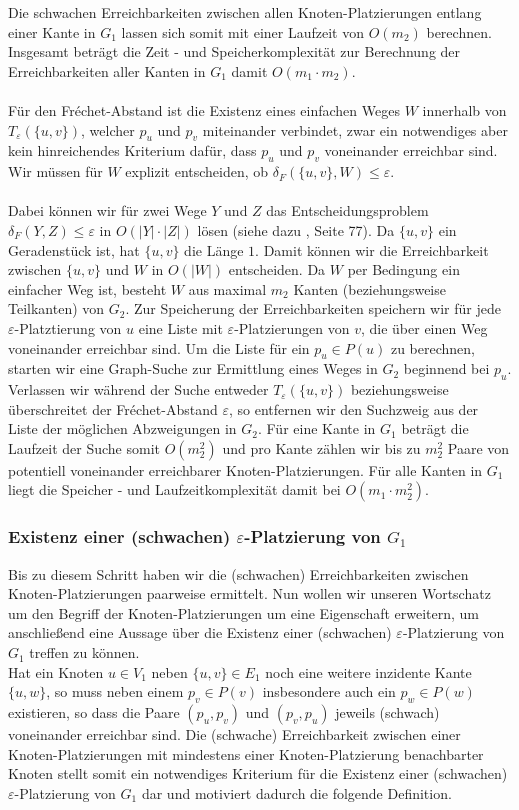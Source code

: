 \documentclass[a4paper, 12pt, twoside]{article}
\theoremstyle{Format1} %
\begin{document}
Die schwachen Erreichbarkeiten zwischen allen Knoten-Platzierungen entlang einer Kante in $G_1$ lassen sich somit mit einer Laufzeit von $O(m_2)$ berechnen.
Insgesamt beträgt die Zeit - und Speicherkomplexität zur Berechnung der Erreichbarkeiten aller Kanten in $G_1$ damit $O(m_1 \cdot m_2)$.
\\
\\
Für den Fréchet-Abstand ist die Existenz eines einfachen Weges $W$ innerhalb von $T_{\varepsilon}(\{u,v\})$, welcher $p_u$ und $p_v$ miteinander verbindet,
zwar ein notwendiges aber kein hinreichendes Kriterium dafür, dass $p_u$ und $p_v$ voneinander erreichbar sind. Wir müssen für $W$ explizit entscheiden,
ob $\delta_F(\{u,v\}, W) \leq \varepsilon$.
\\
\\
Dabei können wir für zwei Wege $Y$ und $Z$ das Entscheidungsproblem $\delta_F(Y,Z) \leq \varepsilon$ in $O(|Y| \cdot |Z|)$ lösen (siehe dazu \cite{Alt}, Seite 77).
Da $\{u,v\}$ ein Geradenstück ist, hat $\{u,v\}$ die Länge $1$. Damit können wir die Erreichbarkeit zwischen $\{u,v\}$ und $W$ in $O(|W|)$ entscheiden.
Da $W$ per Bedingung ein einfacher Weg ist, besteht $W$ aus maximal $m_2$ Kanten (beziehungsweise Teilkanten) von $G_2$.
Zur Speicherung der Erreichbarkeiten speichern wir für jede $\varepsilon$-Platztierung von $u$ eine Liste mit $\varepsilon$-Platzierungen von $v$, die
über einen Weg voneinander erreichbar sind. Um die Liste für ein $p_u \in P(u)$ zu berechnen, starten wir eine Graph-Suche zur Ermittlung eines
Weges in $G_2$ beginnend bei $p_u$. Verlassen wir während der Suche entweder $T_{\varepsilon}(\{u,v\})$ beziehungsweise überschreitet der Fréchet-Abstand $\varepsilon$,
so entfernen wir den Suchzweig aus der Liste der möglichen Abzweigungen in $G_2$.
Für eine Kante in $G_1$ beträgt die Laufzeit der Suche somit $O(m_2^2)$ und pro Kante zählen wir bis zu $m_2^2$ Paare von potentiell voneinander erreichbarer Knoten-Platzierungen.
Für alle Kanten in $G_1$ liegt die Speicher - und Laufzeitkomplexität damit bei $O(m_1 \cdot m_2^2)$.

\subsubsection{Existenz einer (schwachen) $\varepsilon$-Platzierung von $G_1$}
Bis zu diesem Schritt haben wir die (schwachen) Erreichbarkeiten zwischen Knoten-Platzierungen paarweise ermittelt.
Nun wollen wir unseren Wortschatz um den Begriff der Knoten-Platzierungen um eine Eigenschaft erweitern, um anschließend eine Aussage über die Existenz
einer (schwachen) $\varepsilon$-Platzierung von $G_1$ treffen zu können.
\\
Hat ein Knoten $u \in V_1$ neben $\{u,v\} \in E_1$ noch eine weitere inzidente Kante $\{u,w\}$, so muss neben einem $p_v \in P(v)$ insbesondere auch
ein $p_w \in P(w)$ existieren, so dass die Paare $(p_u,p_v)$ und $(p_v,p_u)$ jeweils (schwach) voneinander erreichbar sind. Die (schwache) Erreichbarkeit
zwischen einer Knoten-Platzierungen mit mindestens einer Knoten-Platzierung benachbarter Knoten stellt somit ein notwendiges Kriterium für die Existenz
einer (schwachen) $\varepsilon$-Platzierung von $G_1$ dar und motiviert dadurch die folgende Definition.
\end{document}
